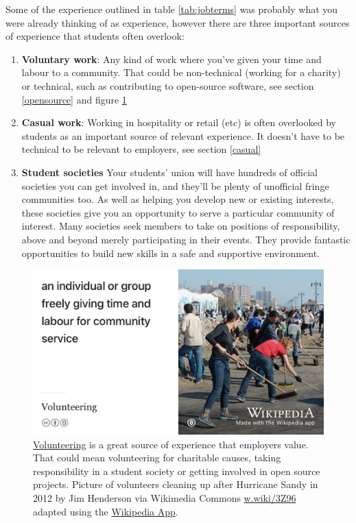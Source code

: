 \documentclass[
]{book}
\providecommand{\tightlist}{%
  \setlength{\itemsep}{0pt}\setlength{\parskip}{0pt}}
\begin{document}
Some of the experience outlined in table \ref{tab:jobterms} was probably what you were already thinking of as experience, however there are three important sources of experience that students often overlook:

\begin{enumerate}
\def\labelenumi{\arabic{enumi}.}
\tightlist
\item
  \textbf{Voluntary work}: Any kind of work where you've given your time and labour to a community. That could be non-technical (working for a charity) or technical, such as contributing to open-source software, see section \ref{opensource} and figure \ref{fig:volunthero-fig}
\item
  \textbf{Casual work}: Working in hospitality or retail (etc) is often overlooked by students as an important source of relevant experience. It doesn't have to be technical to be relevant to employers, see section \ref{casual}
\item
  \textbf{Student societies} Your students' union will have hundreds of official societies you can get involved in, and they'll be plenty of unofficial fringe communities too. As well as helping you develop new or existing interests, these societies give you an opportunity to serve a particular community of interest. Many societies seek members to take on positions of responsibility, above and beyond merely participating in their events. They provide fantastic opportunities to build new skills in a safe and supportive environment.
\end{enumerate}

\begin{figure}

{\centering \includegraphics[width=1\linewidth]{images/volunthero} 

}

\caption{\href{https://en.wikipedia.org/wiki/Volunteering}{Volunteering} is a great source of experience that employers value. That could mean volunteering for charitable causes, taking responsibility in a student society or getting involved in open source projects. Picture of volunteers cleaning up after Hurricane Sandy in 2012 by Jim Henderson via Wikimedia Commons \href{https://w.wiki/3Z96}{w.wiki/3Z96} adapted using the \href{https://apps.apple.com/us/app/wikipedia/id324715238}{Wikipedia App}.}\label{fig:volunthero-fig}
\end{figure}
\end{document}
